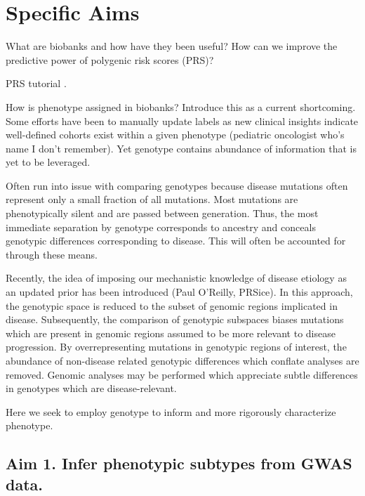 \documentclass[11pt]{article}  %
\newcommand{\inden}[1]{\mbox{} \hspace{#1} } %
\begin{document}
\pagestyle{empty}












\section*{Specific Aims}
What are biobanks and how have they been useful? How can we improve the predictive power of polygenic risk scores (PRS)?  

PRS tutorial \cite{choi_tutorial_2020}.

How is phenotype assigned in biobanks? Introduce this as a current shortcoming. Some efforts have been to manually update labels as new clinical insights indicate well-defined cohorts exist within a given phenotype (pediatric oncologist who’s name I don't remember). Yet genotype contains abundance of information that is yet to be leveraged.

Often run into issue with comparing genotypes because disease mutations often represent only a small fraction of all mutations. Most mutations are phenotypically silent and are passed between generation. Thus, the most immediate separation by genotype corresponds to ancestry and conceals genotypic differences corresponding to disease. This will often be accounted for through these means.

Recently, the idea of imposing our mechanistic knowledge of disease etiology as an updated prior has been introduced (Paul O’Reilly, PRSice). In this approach, the genotypic space is reduced to the subset of genomic regions implicated in disease. Subsequently, the comparison of genotypic subspaces biases mutations which are present in genomic regions assumed to be more relevant to disease progression. By overrepresenting mutations in genotypic regions of interest, the abundance of non-disease related genotypic differences which conflate analyses are removed. Genomic analyses may be performed which appreciate subtle differences in genotypes which are disease-relevant.

Here we seek to employ genotype to inform and more rigorously characterize phenotype.


\subsection*{Aim 1. Infer phenotypic subtypes from GWAS data.}
\end{document}
